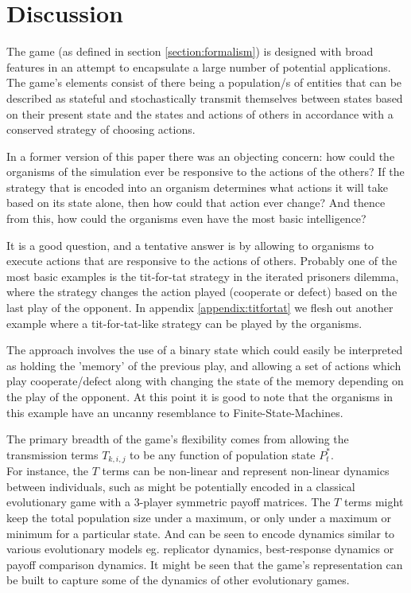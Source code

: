 \section{Discussion}\label{sec:discussion}

The game (as defined in section \ref{section:formalism}) is designed with broad features in an attempt to encapsulate a large number of potential applications.
The game's elements consist of there being a population/s of entities that can be described as stateful and stochastically transmit themselves between states based on their present state and the states and actions of others in accordance with a conserved strategy of choosing actions.

In a former version of this paper there was an objecting concern: how could the organisms of the simulation ever be responsive to the actions of the others?
If the strategy that is encoded into an organism determines what actions it will take based on its state alone, then how could that action ever change? And thence from this, how could the organisms even have the most basic intelligence?

It is a good question, and a tentative answer is by allowing to organisms to execute actions that are responsive to the actions of others.
Probably one of the most basic examples is the tit-for-tat strategy in the iterated prisoners dilemma, where the strategy changes the action played (cooperate or defect) based on the last play of the opponent. In appendix \ref{appendix:titfortat} we flesh out another example where a tit-for-tat-like strategy can be played by the organisms.

The approach involves the use of a binary state which could easily be interpreted as holding the 'memory' of the previous play, and allowing a set of actions which play cooperate/defect along with changing the state of the memory depending on the play of the opponent.
At this point it is good to note that the organisms in this example have an uncanny resemblance to Finite-State-Machines.

The primary breadth of the game's flexibility comes from allowing the transmission terms $T_{k,i,j}$ to be any function of population state $P^*_t$.\\
For instance, the $T$ terms can be non-linear and represent non-linear dynamics between individuals, such as might be potentially encoded in a classical evolutionary game with a 3-player symmetric payoff matrices. The $T$ terms might keep the total population size under a maximum, or only under a maximum or minimum for a particular state. And can be seen to encode dynamics similar to various evolutionary models eg. replicator dynamics, best-response dynamics or payoff comparison dynamics.\cite{psr1,errors1} It might be seen that the game's representation can be built to capture some of the dynamics of other evolutionary games.

